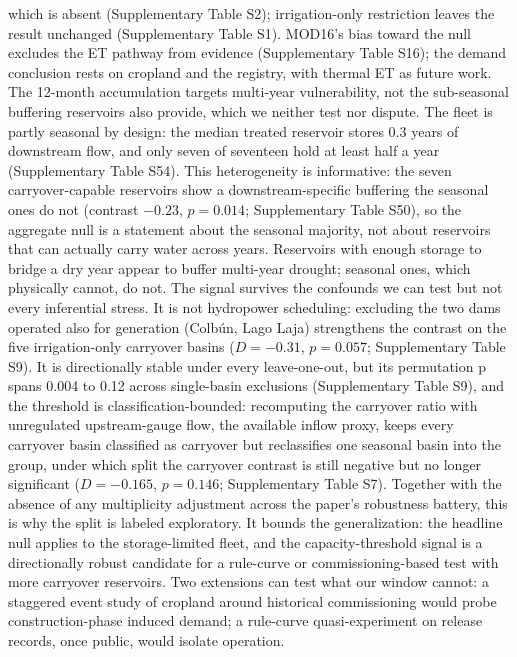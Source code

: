 \documentclass[
]{agujournal2019}
\begin{document}
which is absent (Supplementary Table S2); irrigation-only restriction
leaves the result unchanged (Supplementary Table S1). MOD16's bias
toward the null excludes the ET pathway from evidence (Supplementary
Table S16); the demand conclusion rests on cropland and the registry,
with thermal ET as future work. The 12-month accumulation targets
multi-year vulnerability, not the sub-seasonal buffering reservoirs also
provide, which we neither test nor dispute. The fleet is partly seasonal
by design: the median treated reservoir stores 0.3 years of downstream
flow, and only seven of seventeen hold at least half a year
(Supplementary Table S54). This heterogeneity is informative: the seven
carryover-capable reservoirs show a downstream-specific buffering the
seasonal ones do not (contrast \(-0.23\), \(p = 0.014\); Supplementary
Table S50), so the aggregate null is a statement about the seasonal
majority, not about reservoirs that can actually carry water across
years. Reservoirs with enough storage to bridge a dry year appear to
buffer multi-year drought; seasonal ones, which physically cannot, do
not. The signal survives the confounds we can test but not every
inferential stress. It is not hydropower scheduling: excluding the two
dams operated also for generation (Colbún, Lago Laja) strengthens the
contrast on the five irrigation-only carryover basins (\(D = -0.31\),
\(p = 0.057\); Supplementary Table S9). It is directionally stable under
every leave-one-out, but its permutation p spans 0.004 to 0.12 across
single-basin exclusions (Supplementary Table S9), and the threshold is
classification-bounded: recomputing the carryover ratio with unregulated
upstream-gauge flow, the available inflow proxy, keeps every carryover
basin classified as carryover but reclassifies one seasonal basin into
the group, under which split the carryover contrast is still negative
but no longer significant (\(D = -0.165\), \(p = 0.146\); Supplementary
Table S7). Together with the absence of any multiplicity adjustment
across the paper's robustness battery, this is why the split is labeled
exploratory. It bounds the generalization: the headline null applies to
the storage-limited fleet, and the capacity-threshold signal is a
directionally robust candidate for a rule-curve or commissioning-based
test with more carryover reservoirs. Two extensions can test what our
window cannot: a staggered event study of cropland around historical
commissioning would probe construction-phase induced demand; a
rule-curve quasi-experiment on release records, once public, would
isolate operation.
\end{document}
